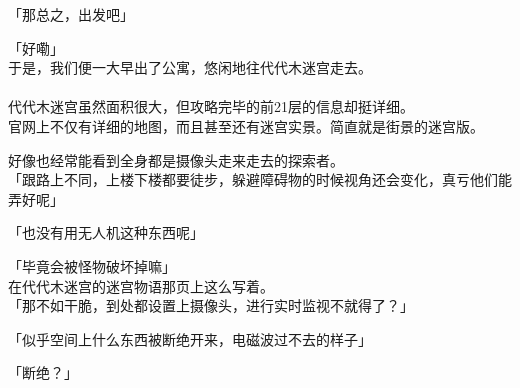 「那总之，出发吧」

「好嘞」\\

于是，我们便一大早出了公寓，悠闲地往代代木迷宫走去。\\

\sqsplit\\

代代木迷宫虽然面积很大，但攻略完毕的前21层的信息却挺详细。\\

官网上不仅有详细的地图，而且甚至还有迷宫实景。简直就是街景的迷宫版。

好像也经常能看到全身都是摄像头走来走去的探索者。\\

「跟路上不同，上楼下楼都要徒步，躲避障碍物的时候视角还会变化，真亏他们能弄好呢」

「也没有用无人机这种东西呢」

「毕竟会被怪物破坏掉嘛」\\

在代代木迷宫的迷宫物语那页上这么写着。\\

「那不如干脆，到处都设置上摄像头，进行实时监视不就得了？」

「似乎空间上什么东西被断绝开来，电磁波过不去的样子」

「断绝？」\\

